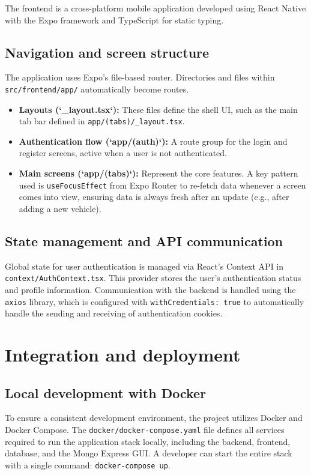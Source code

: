 The frontend is a cross-platform mobile application developed using React Native with the Expo framework and TypeScript for static typing.

\subsection{Navigation and screen structure}
The application uses Expo's file-based router. Directories and files within \texttt{src/frontend/app/} automatically become routes.
\begin{itemize}
    \item \textbf{Layouts (`\_layout.tsx`):} These files define the shell UI, such as the main tab bar defined in \texttt{app/(tabs)/\_layout.tsx}.
    \item \textbf{Authentication flow (`app/(auth)`):} A route group for the login and register screens, active when a user is not authenticated.
    \item \textbf{Main screens (`app/(tabs)`):} Represent the core features. A key pattern used is \texttt{useFocusEffect} from Expo Router to re-fetch data whenever a screen comes into view, ensuring data is always fresh after an update (e.g., after adding a new vehicle).
\end{itemize}

\subsection{State management and API communication}
Global state for user authentication is managed via React's Context API in \texttt{context/AuthContext.tsx}. This provider stores the user's authentication status and profile information. Communication with the backend is handled using the \texttt{axios} library, which is configured with \texttt{withCredentials: true} to automatically handle the sending and receiving of authentication cookies.

\section{Integration and deployment}

\subsection{Local development with Docker}
To ensure a consistent development environment, the project utilizes Docker and Docker Compose. The \texttt{docker/docker-compose.yaml} file defines all services required to run the application stack locally, including the backend, frontend, database, and the Mongo Express GUI. A developer can start the entire stack with a single command: \texttt{docker-compose up}.


